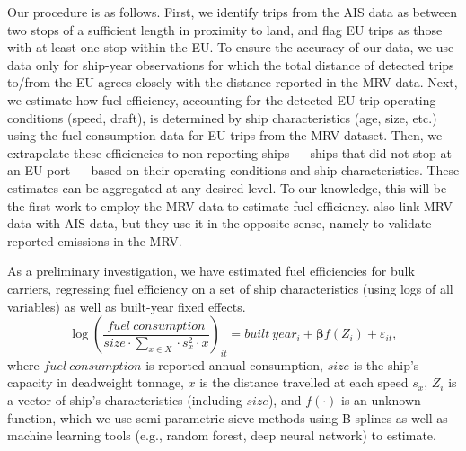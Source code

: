 \documentclass[hidelinks, 12pt,letterpaper]{article}
\begin{document}
Our procedure is as follows. First, we identify trips from the AIS data as between two stops of a sufficient length in proximity to land, and flag EU trips as those with at least one stop within the EU. To ensure the accuracy of our data, we use data only for ship-year observations for which the total distance of detected trips to/from the EU agrees closely with the distance reported in the MRV data. %
Next, we estimate how fuel efficiency, accounting for the detected EU trip operating conditions (speed, draft), is determined by ship characteristics (age, size, etc.) using the fuel consumption data for EU trips from the MRV dataset. 
Then, we extrapolate these efficiencies to non-reporting ships --- ships that did not stop at an EU port --- based on their operating conditions and ship characteristics. 
These estimates can be aggregated at any desired level. To our knowledge, this will be the first work to employ the MRV data to estimate fuel efficiency. \citet{uge2020estimation} also link MRV data with AIS data, but they use it in the opposite sense, namely to validate reported emissions in the MRV.

As a preliminary investigation, we have estimated fuel efficiencies for bulk carriers, regressing fuel efficiency on a set of ship characteristics (using logs of all variables) as well as built-year fixed effects.
 \begin{equation}\label{eq1}
 \log\left(
     \frac{fuel~consumption}{size \cdot \sum_{x \in X}  \cdot s_x^2 \cdot x}
 \right)_{it}
         = built~year_{i} + \boldsymbol{\beta} f(Z_i) + \varepsilon_{it},
 \end{equation}
 where $fuel~consumption$ is reported annual consumption, $size$ is the ship's capacity in deadweight tonnage, $x$ is the distance travelled at each speed $s_x$, $Z_i$ is a vector of ship's characteristics (including $size$), and $f(\cdot)$ is an unknown function, which we use semi-parametric sieve methods using B-splines as well as machine learning tools (e.g., random forest, deep neural network) to estimate.
\end{document}

